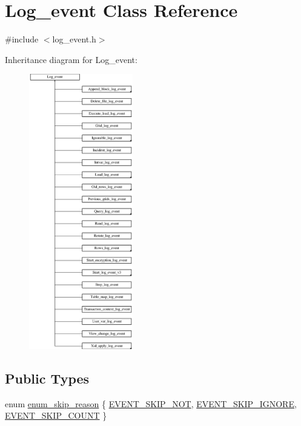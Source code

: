 \hypertarget{classLog__event}{}\section{Log\+\_\+event Class Reference}
\label{classLog__event}


{\ttfamily \#include $<$log\+\_\+event.\+h$>$}

Inheritance diagram for Log\+\_\+event\+:\begin{figure}[H]
\begin{center}
\leavevmode
\includegraphics[height=12.000000cm]{classLog__event}
\end{center}
\end{figure}
\subsection*{Public Types}
\begin{DoxyCompactItemize}
\item 
enum \mbox{\hyperlink{classLog__event_a44955437350a8b9039e32f019dfed40d}{enum\+\_\+skip\+\_\+reason}} \{ \mbox{\hyperlink{classLog__event_a44955437350a8b9039e32f019dfed40da8b9ef0989b09bb046b31b51b888d5f6d}{E\+V\+E\+N\+T\+\_\+\+S\+K\+I\+P\+\_\+\+N\+OT}}, 
\mbox{\hyperlink{classLog__event_a44955437350a8b9039e32f019dfed40da5cf178e7946f6b891d39e87d986f5f33}{E\+V\+E\+N\+T\+\_\+\+S\+K\+I\+P\+\_\+\+I\+G\+N\+O\+RE}}, 
\mbox{\hyperlink{classLog__event_a44955437350a8b9039e32f019dfed40da7ae688c137a25d774eb8fb2bf022242c}{E\+V\+E\+N\+T\+\_\+\+S\+K\+I\+P\+\_\+\+C\+O\+U\+NT}}
 \}
\end{DoxyCompactItemize}
